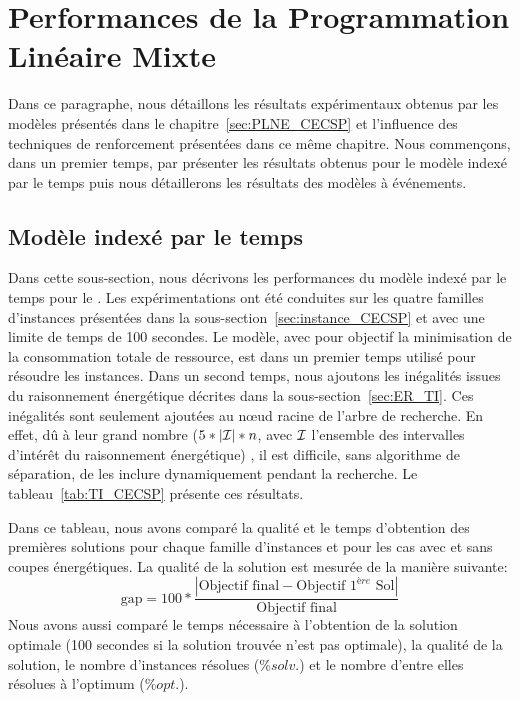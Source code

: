 \section{Performances de la Programmation Linéaire Mixte}
\label{sec:expe_PLNE}
Dans ce paragraphe, nous détaillons les résultats expérimentaux
obtenus par les modèles présentés dans le
chapitre~\ref{sec:PLNE_CECSP} et l'influence des techniques de
renforcement présentées dans ce même chapitre. Nous commençons, dans
un premier temps, par présenter les résultats obtenus pour le modèle
indexé par le temps puis nous détaillerons les résultats des modèles à
événements. 

\subsection{Modèle indexé par le temps}
Dans cette sous-section, nous décrivons les performances du modèle
indexé par le temps pour le \CECSP. Les expérimentations ont été
conduites sur les quatre familles d'instances présentées dans la
sous-section~\ref{sec:instance_CECSP} et avec une limite de temps de
100 secondes. Le modèle, avec pour objectif la minimisation de la
consommation totale de ressource, est dans un premier temps utilisé
pour résoudre les instances. Dans un second temps, nous ajoutons les
inégalités issues du raisonnement énergétique décrites dans la
sous-section~\ref{sec:ER_TI}. Ces inégalités sont seulement ajoutées
au n\oe ud racine de l'arbre de recherche. En effet, dû à leur grand
nombre ($5*|{\cal I}|*n$, avec ${\cal I}$ l'ensemble des intervalles d'intérêt du
raisonnement énergétique) , il est difficile, sans algorithme de
séparation, de les inclure dynamiquement pendant la recherche. Le
tableau~\ref{tab:TI_CECSP} présente ces résultats.

Dans ce tableau, nous avons comparé la qualité et le temps d'obtention
des premières solutions pour chaque famille d'instances et pour les
cas avec et sans coupes énergétiques. La qualité de la solution est
mesurée de la manière suivante: 
\[
  \text{gap}=100*\frac{|\text{Objectif final} - \text{Objectif } 1^{ère} \text{  Sol}|}{\text{Objectif final}}
\]
Nous avons aussi comparé le temps nécessaire à l'obtention de la
solution optimale (100 secondes si la solution trouvée n'est pas
optimale), la qualité de la solution, le nombre d'instances résolues
($\%solv.$) et le nombre d'entre elles résolues à l'optimum ($\%opt.$).

